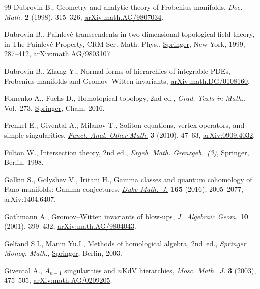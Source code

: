 \documentclass[10pt,a4paper]{article}
\numberwithin{equation}{section}
\begin{document}
\begin{thebibliography}{99}
Dubrovin B., Geometry and analytic theory of {F}robenius manifolds,
 \textit{Doc. Math.} \textbf{2} (1998), 315--326, \href{https://arxiv.org/abs/math.AG/9807034}{arXiv:math.AG/9807034}.

Dubrovin B., Painlev\'e transcendents in two-dimensional topological field
 theory, in The {P}ainlev\'e {P}roperty, CRM Ser. Math. Phys., \href{https://doi.org/10.1007/978-1-4612-1532-5_6}{Springer}, New
 York, 1999, 287--412, \href{https://arxiv.org/abs/math.AG/9803107}{arXiv:math.AG/9803107}.

Dubrovin B., Zhang Y., Normal forms of hierarchies of integrable {PDE}s,
 {F}robenius manifolds and {G}romov--{W}itten invariants,
 \href{https://arxiv.org/abs/math.DG/0108160}{arXiv:math.DG/0108160}.

Fomenko A., Fuchs D., Homotopical topology, 2nd ed., \textit{Grad. Texts in Math.}, Vol.~273, \href{https://doi.org/10.1007/978-3-319-23488-5}{Springer}, Cham, 2016.

Frenkel E., Givental A., Milanov T., Soliton equations, vertex operators, and
 simple singularities, \href{https://doi.org/10.1007/s11853-010-0035-6}{\textit{Funct. Anal. Other Math.}} \textbf{3} (2010),
 47--63, \href{https://arxiv.org/abs/0909.4032}{arXiv:0909.4032}.

Fulton W., Intersection theory, 2nd ed., \textit{Ergeb. Math. Grenzgeb.~(3)}, \href{https://doi.org/10.1007/978-1-4612-1700-8}{Springer},
 Berlin, 1998.

Galkin S., Golyshev V., Iritani H., Gamma classes and quantum cohomology of
 {F}ano manifolds: {G}amma conjectures, \href{https://doi.org/10.1215/00127094-3476593}{\textit{Duke Math.~J.}} \textbf{165}
 (2016), 2005--2077, \href{https://arxiv.org/abs/1404.6407}{arXiv:1404.6407}.

Gathmann A., Gromov--{W}itten invariants of blow-ups, \textit{J.~Algebraic
 Geom.} \textbf{10} (2001), 399--432, \href{https://arxiv.org/abs/math.AG/9804043}{arXiv:math.AG/9804043}.

Gelfand S.I., Manin Yu.I., Methods of homological algebra, 2nd~ed., \textit{Springer
 Monog. Math.}, \href{https://doi.org/10.1007/978-3-662-12492-5}{Springer}, Berlin, 2003.

Givental A., {$A_{n-1}$} singularities and {$n$}{K}d{V} hierarchies,
 \href{https://doi.org/10.17323/1609-4514-2003-3-2-475-505}{\textit{Mosc. Math.~J.}} \textbf{3} (2003), 475--505,
 \href{https://arxiv.org/abs/math.AG/0209205}{arXiv:math.AG/0209205}.


\end{thebibliography}
\end{document}
